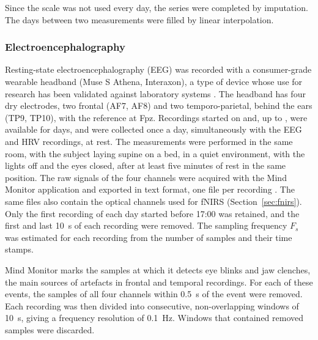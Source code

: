 \documentclass[11pt,a4paper]{article}
\begin{document}
Since the scale was not used every day, the series were completed by imputation. The
days between two measurements were filled by linear interpolation. 

\subsubsection{Electroencephalography}\label{sec:eeg}

Resting-state electroencephalography (EEG) was recorded with a consumer-grade wearable
headband (Muse S Athena, Interaxon), a type of device whose use for research has been
validated against laboratory systems \citep{krigolson2017}. The headband has four dry
electrodes, two frontal (AF7, AF8) and two temporo-parietal, behind the ears (TP9,
TP10), with the reference at Fpz. Recordings started on \eegStart{} and, up to \eegEnd{}, 
were available for \eegDays{} days, and were collected once a day, 
simultaneously with the EEG and HRV recordings, at rest. The measurements were performed in the same room, 
with the subject laying supine on a bed, in a quiet environment, with the lights 
off and the eyes closed, after at least five minutes of rest in the same position. 
 The raw signals of the four channels were acquired with the Mind Monitor application and exported in text format,
one file per recording \citep{clutterbuck_mindmonitor}. The same files also contain the
optical channels used for fNIRS (Section~\ref{sec:fnirs}). Only the first recording of
each day started before 17:00 was retained, and the first and last \SI{10}{\second} of
each recording were removed. The sampling frequency $F_s$ was estimated for each
recording from the number of samples and their time stamps.

Mind Monitor marks the samples at which it detects eye blinks and jaw clenches, the
main sources of artefacts in frontal and temporal recordings. For each of these
events, the samples of all four channels within \SI{0.5}{\second} of the event were
removed. Each recording was then divided into consecutive, non-overlapping windows of
\SI{10}{\second}, giving a frequency resolution of \SI{0.1}{\hertz}. Windows that
contained removed samples were discarded.
\end{document}
